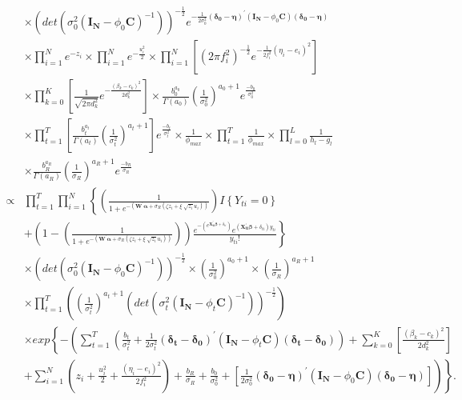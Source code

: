 \documentclass[12pt,a4paper]{article}
\begin{document}
\begin{CJK}{UTF8}{bkai}
\begin{align*}
  & \times
\left( det\left(\sigma_0^2(\bm{I_N}-\phi_0\bm{C})^{-1}\right) \right)^{-\frac{1}{2}} e^{ -\frac{1}{2\sigma_0^2}(\bm{\delta_0}-\bm{\eta})^\prime(\bm{I_N}-\phi_0\bm{C})(\bm{\delta_0}-\bm{\eta})}\\[3mm]
  & \times
\prod_{i=1}^N e^{-z_i} \times \prod_{i=1}^N e^{-\frac{u_i^2}{2}} \times \prod_{i=1}^N \left[ \left(2 \pi f_i^2 \right)^{-\frac{1}{2}}e^{ -\frac{1}{2 f_i^2}(\eta_i-e_i)^2}\right] \\[3mm]
  & \times
\prod_{k=0}^K \left[ \frac{1}{\sqrt{2\pi d_k^2}}e^{-\frac{(\beta_k-c_k)^2}{2d_k^2}}\right] \times \frac{b_0^{a_0}}{\Gamma(a_0)}\left(\frac{1}{\sigma_0^2}\right)^{a_0+1}e^{\frac{-b_0}{\sigma_0^2}} \\[3mm]
  & \times
\prod_{t=1}^T\left[ \frac{b_t^{a_t}}{\Gamma(a_t)}\left(\frac{1}{\sigma_t^2}\right)^{a_t+1}\right]e^{\frac{-b_t}{\sigma_t^2}} \times \frac{1}{\phi_{max}} \times \prod_{t=1}^T\frac{1}{\phi_{max}} \times \prod_{l=0}^L\frac{1}{h_l-g_l} \\[3mm]
  & \times
\frac{b_R^{a_R}}{\Gamma(a_R)}\left(\frac{1}{\sigma_R}\right)^{a_R+1}e^{\frac{-b_R}{\sigma_R}}\\[3mm]
  \propto &
\prod_{t=1}^T\prod_{i=1}^N \left\{ \left( \frac{1}{1+e^{-(\bm{W^\prime}\bm{\alpha}+\sigma_R(\zeta z_i+\xi \sqrt[]{z_i} u_i))}} \right)I\left\{ Y_{ti} = 0\right\} \right.\\[3mm]
& + \left. \left(1-\left( \frac{1}{1+e^{-(\bm{W^\prime}\bm{\alpha}+\sigma_R(\zeta z_i+\xi \sqrt[]{z_i} u_i))}} \right)\right)\frac{e^{-\left(e^{\bm{X_{ti}^\prime\bm{\beta}}+\delta_{ti}}\right)}e^{(\bm{X_{ti}^\prime\bm{\beta}}+\delta_{ti})y_{ti}}}{y_{ti}!}\right\}      \\[3mm]
  & \times \left( det\left(\sigma_0^2(\bm{I_N}-\phi_0\bm{C})^{-1}\right) \right)^{-\frac{1}{2}} \times \left(\frac{1}{\sigma_0^2}\right)^{a_0+1} \times \left(\frac{1}{\sigma_R}\right)^{a_R+1} \\[3mm]
  & \times
\prod_{t=1}^T \left(\left(\frac{1}{\sigma_t^2}\right)^{a_t+1}\left( det\left(\sigma_t^2(\bm{I_N}-\phi_t\bm{C})^{-1}\right) \right)^{-\frac{1}{2}}\right)    \\[3mm]
  & \times
 exp \left\{-\left( \sum_{t=1}^T\left(\frac{b_t}{\sigma_t^2}+\frac{1}{2\sigma_t^2}(\bm{\delta_t}-\bm{\delta_0})^\prime(\bm{I_N}-\phi_t\bm{C})(\bm{\delta_t}-\bm{\delta_0})\right) + \sum_{k=0}^K\left[\frac{(\beta_k-c_k)^2}{2d_k^2}\right] \right.\right.\\[3mm]
& \left.\left. + \sum_{i=1}^N \left( z_i + \frac{u_i^2}{2}+\frac{(\eta_i-e_i)^2}{2 f_i^2}\right) + \frac{b_R}{\sigma_R}+\frac{b_0}{\sigma_0^2}+\left[\frac{1}{2\sigma_0^2}(\bm{\delta_0}-\bm{\eta})^\prime(\bm{I_N}-\phi_0\bm{C})(\bm{\delta_0}-\bm{\eta})\right]\right)\right\}.

\end{align*}
\end{CJK}
\end{document}
